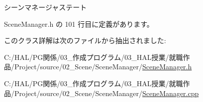 シーンマネージャステート 



 Scene\+Manager.\+h の 101 行目に定義があります。



このクラス詳解は次のファイルから抽出されました\+:\begin{DoxyCompactItemize}
\item 
C\+:/\+H\+A\+L/\+P\+G関係/03\+\_\+作成プログラム/03\+\_\+\+H\+A\+L授業/就職作品/\+Project/source/02\+\_\+\+Scene/\+Scene\+Manager/\mbox{\hyperlink{_scene_manager_8h}{Scene\+Manager.\+h}}\item 
C\+:/\+H\+A\+L/\+P\+G関係/03\+\_\+作成プログラム/03\+\_\+\+H\+A\+L授業/就職作品/\+Project/source/02\+\_\+\+Scene/\+Scene\+Manager/\mbox{\hyperlink{_scene_manager_8cpp}{Scene\+Manager.\+cpp}}\end{DoxyCompactItemize}
